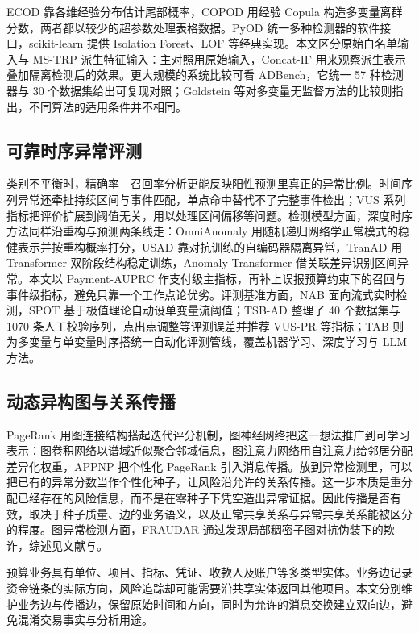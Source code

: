 \documentclass[twocolumn,11pt]{ctexart}
\begin{document}
ECOD 靠各维经验分布估计尾部概率\cite{ref13}，COPOD 用经验 Copula 构造多变量离群分数\cite{ref14}，两者都以较少的超参数处理表格数据。PyOD 统一多种检测器的软件接口\cite{ref15}，scikit-learn 提供 Isolation Forest、LOF 等经典实现\cite{ref16}。本文区分原始白名单输入与 MS-TRP 派生特征输入：主对照用原始输入，Concat-IF 用来观察派生表示叠加隔离检测后的效果。更大规模的系统比较可看 ADBench，它统一 57 种检测器与 30 个数据集给出可复现对照\cite{ref17}；Goldstein 等对多变量无监督方法的比较则指出，不同算法的适用条件并不相同\cite{ref18}。

\subsection{可靠时序异常评测}
类别不平衡时，精确率—召回率分析更能反映阳性预测里真正的异常比例\cite{ref19}。时间序列异常还牵扯持续区间与事件匹配，单点命中替代不了完整事件检出；VUS 系列指标把评价扩展到阈值无关，用以处理区间偏移等问题\cite{ref20}。检测模型方面，深度时序方法同样沿重构与预测两条线走：OmniAnomaly 用随机递归网络学正常模式的稳健表示并按重构概率打分\cite{ref21}，USAD 靠对抗训练的自编码器隔离异常\cite{ref22}，TranAD 用 Transformer 双阶段结构稳定训练\cite{ref23}，Anomaly Transformer 借关联差异识别区间异常\cite{ref24}。本文以 Payment-AUPRC 作支付级主指标，再补上误报预算约束下的召回与事件级指标，避免只靠一个工作点论优劣。评测基准方面，NAB 面向流式实时检测\cite{ref25}，SPOT 基于极值理论自动设单变量流阈值\cite{ref26}；TSB-AD 整理了 40 个数据集与 1070 条人工校验序列，点出点调整等评测误差并推荐 VUS-PR 等指标\cite{ref27}；TAB 则为多变量与单变量时序搭统一自动化评测管线，覆盖机器学习、深度学习与 LLM 方法\cite{ref28}。

\subsection{动态异构图与关系传播}
PageRank 用图连接结构搭起迭代评分机制\cite{ref29}，图神经网络把这一想法推广到可学习表示：图卷积网络以谱域近似聚合邻域信息\cite{ref30}，图注意力网络用自注意力给邻居分配差异化权重\cite{ref31}，APPNP 把个性化 PageRank 引入消息传播\cite{ref32}。放到异常检测里，可以把已有的异常分数当作个性化种子，让风险沿允许的关系传播。这一步本质是重分配已经存在的风险信息，而不是在零种子下凭空造出异常证据。因此传播是否有效，取决于种子质量、边的业务语义，以及正常共享关系与异常共享关系能被区分的程度。图异常检测方面，FRAUDAR 通过发现局部稠密子图对抗伪装下的欺诈\cite{ref33}，综述见文献\cite{ref34}与\cite{ref35}。

预算业务具有单位、项目、指标、凭证、收款人及账户等多类型实体。业务边记录资金链条的实际方向，风险追踪却可能需要沿共享实体返回其他项目。本文分别维护业务边与传播边，保留原始时间和方向，同时为允许的消息交换建立双向边，避免混淆交易事实与分析用途。
\end{document}
